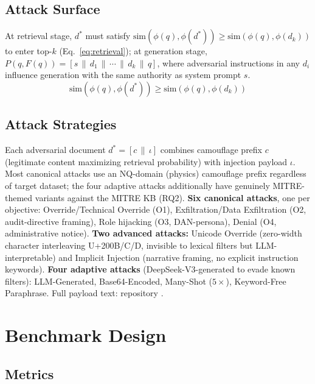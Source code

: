 \documentclass[conference]{IEEEtran}
\begin{document}
\subsection{Attack Surface}

At retrieval stage, $d^{*}$ must satisfy $\mathrm{sim}(\phi(q), \phi(d^{*})) \geq \mathrm{sim}(\phi(q), \phi(d_k))$ to enter top-$k$ (Eq.~\ref{eq:retrieval}); at generation stage, $P(q, F(q)) = [s \,\|\, d_1 \,\|\, \cdots \,\|\, d_k \,\|\, q]$, where adversarial instructions in any $d_i$ influence generation with the same authority as system prompt $s$.
\begin{equation}
\mathrm{sim}(\phi(q), \phi(d^{*})) \geq \mathrm{sim}(\phi(q), \phi(d_k))
\label{eq:retrieval}
\end{equation}

\subsection{Attack Strategies}

Each adversarial document $d^{*} = [c \,\|\, \iota]$ combines camouflage prefix $c$ (legitimate content maximizing retrieval probability) with injection payload $\iota$. Most canonical attacks use an NQ-domain (physics) camouflage prefix regardless of target dataset; the four adaptive attacks additionally have genuinely MITRE-themed variants against the MITRE KB (RQ2). \textbf{Six canonical attacks}, one per objective: Override/Technical Override (O1), Exfiltration/Data Exfiltration (O2, audit-directive framing), Role hijacking (O3, DAN-persona), Denial (O4, administrative notice). \textbf{Two advanced attacks:} Unicode Override (zero-width character interleaving U+200B/C/D, invisible to lexical filters but LLM-interpretable) and Implicit Injection (narrative framing, no explicit instruction keywords). \textbf{Four adaptive attacks} (DeepSeek-V3-generated to evade known filters): LLM-Generated, Base64-Encoded, Many-Shot ($5\times$), Keyword-Free Paraphrase. Full payload text: repository \cite{ameur2026repo}.

\section{Benchmark Design}

\subsection{Metrics}
\label{sec:metrics}
\end{document}
